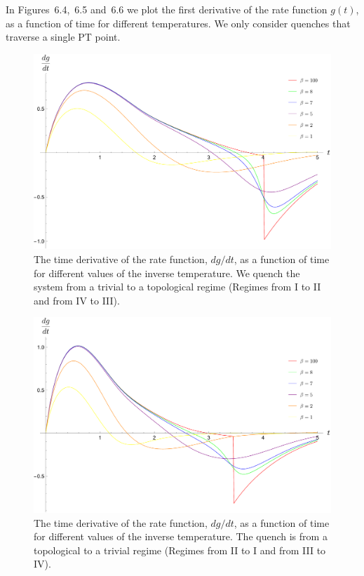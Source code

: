 In Figures~6.4,~6.5 and~6.6 we plot the first derivative of the rate function $g(t)$, as a function of time for different temperatures. We only consider quenches that traverse a single PT point. 

\begin{figure}[h]
\begin{center}
    \includegraphics[scale=0.3]{MDM_trivial_L_topo_-1.pdf}
    \caption{The time derivative of the rate function, $dg/dt$, as a function of time for different values of the inverse temperature. We quench the system from a trivial to a topological regime (Regimes from I to II and from IV to III).}\end{center}
    \label{fig:MDM-trivial-L-topo--1}
    \end{figure}

\begin{figure}[h]   
\begin{center} 
    \includegraphics[scale=0.3]{MDM_topo_-1_trivial_L.pdf}
    \caption{The time derivative of the rate function, $dg/dt$, as a function of time for different values of the inverse temperature. The quench is from a topological to a trivial regime (Regimes from II to I and from III to IV).}\end{center}
     \label{fig:MDM-topo--1-trivial-L}
    \end{figure}

